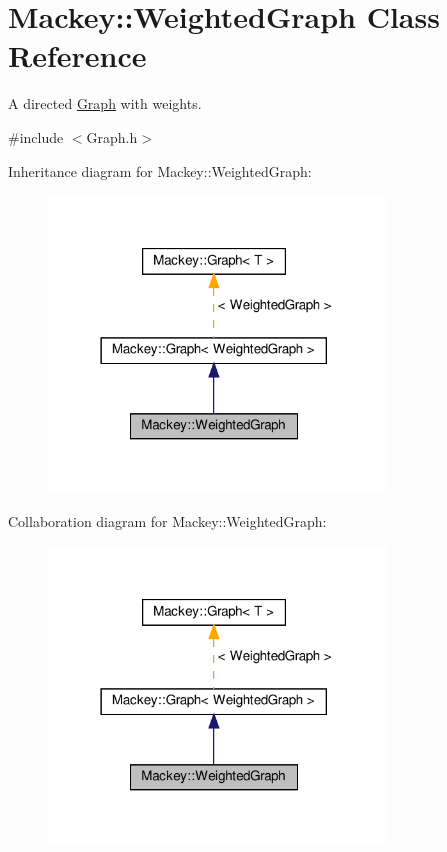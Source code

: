 \hypertarget{classMackey_1_1WeightedGraph}{}\section{Mackey\+:\+:Weighted\+Graph Class Reference}
\label{classMackey_1_1WeightedGraph}


A directed \hyperlink{classMackey_1_1Graph}{Graph} with weights.  




{\ttfamily \#include $<$Graph.\+h$>$}



Inheritance diagram for Mackey\+:\+:Weighted\+Graph\+:\nopagebreak
\begin{figure}[H]
\begin{center}
\leavevmode
\includegraphics[width=254pt]{classMackey_1_1WeightedGraph__inherit__graph}
\end{center}
\end{figure}


Collaboration diagram for Mackey\+:\+:Weighted\+Graph\+:\nopagebreak
\begin{figure}[H]
\begin{center}
\leavevmode
\includegraphics[width=254pt]{classMackey_1_1WeightedGraph__coll__graph}
\end{center}
\end{figure}
